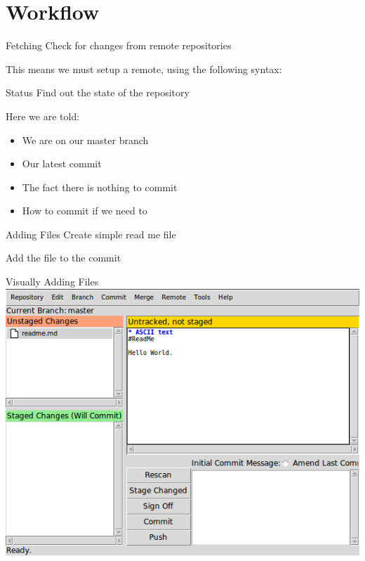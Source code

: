 \documentclass{beamer}
\begin{document}
  \section{Workflow}
  \begin{frame}[fragile=singleslide]{Fetching}
    Check for changes from remote repositories
    
    This means we must setup a remote, using the following syntax:
    
  \end{frame}
  \begin{frame}[fragile=singleslide]{Status}
    Find out the state of the repository
    
    Here we are told:
    \begin{itemize}
      \item We are on our master branch
      \item Our latest commit
      \item The fact there is nothing to commit
      \item How to commit if we need to
    \end{itemize}
  \end{frame}
  \begin{frame}[fragile=singleslide]{Adding Files}
    Create simple read me file
    
    
  \end{frame}
  \begin{frame}[fragile=singleslide]
    Add the file to the commit
    
    
  \end{frame}
  \begin{frame}{Visually Adding Files}
    \centering
    \includegraphics[scale=0.4,keepaspectratio]{git-gui.png}
  \end{frame}
\end{document}
